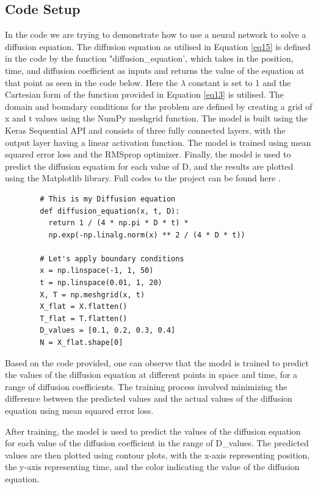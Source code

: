 \subsection{Code Setup}
In the code we are trying to demonstrate how to use a neural network to solve a diffusion equation. The diffusion equation as utilised in Equation \eqref{eq15} is defined in the code by the function "diffusion\_equation', which takes in the position, time, and diffusion coefficient as inputs and returns the value of the equation at that point as seen in the code below. Here the $\lambda$ constant is set to 1 and the Cartesian form of the function provided in Equation \eqref{eq13} is utilised. The domain and boundary conditions for the problem are defined by creating a grid of x and t values using the NumPy meshgrid function. The model is built using the Keras Sequential API and consists of three fully connected layers, with the output layer having a linear activation function. The model is trained using mean squared error loss and the RMSprop optimizer. Finally, the model is used to predict the diffusion equation for each value of D, and the results are plotted using the Matplotlib library. Full codes to the project can be found here \cite{Eyob2023_Git}.

\begin{center}
   \begin{verbatim}
        # This is my Diffusion equation
        def diffusion_equation(x, t, D):
          return 1 / (4 * np.pi * D * t) * 
          np.exp(-np.linalg.norm(x) ** 2 / (4 * D * t))
    
        # Let's apply boundary conditions
        x = np.linspace(-1, 1, 50)
        t = np.linspace(0.01, 1, 20)
        X, T = np.meshgrid(x, t)
        X_flat = X.flatten()
        T_flat = T.flatten()
        D_values = [0.1, 0.2, 0.3, 0.4]
        N = X_flat.shape[0]
\end{verbatim} 
\end{center}


Based on the code provided, one can observe that the model is trained to predict the values of the diffusion equation at different points in space and time, for a range of diffusion coefficients. The training process involved minimizing the difference between the predicted values and the actual values of the diffusion equation using mean squared error loss. 

After training, the model is used to predict the values of the diffusion equation for each value of the diffusion coefficient in the range of D\_values. The predicted values are then plotted using contour plots, with the x-axis representing position, the y-axis representing time, and the color indicating the value of the diffusion equation.

